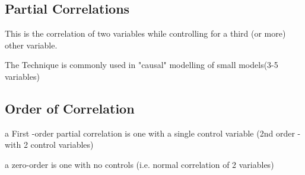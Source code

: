 \subsection{Partial Correlations}

This is the correlation of two variables while controlling for a third (or more) other variable.

The Technique is commonly used in "causal" modelling of small models(3-5 variables)

\subsection{Order of Correlation}
a First -order partial correlation is one with a single control variable (2nd order - with 2 control variables)

a zero-order is one with no controls (i.e. normal correlation of 2 variables)
